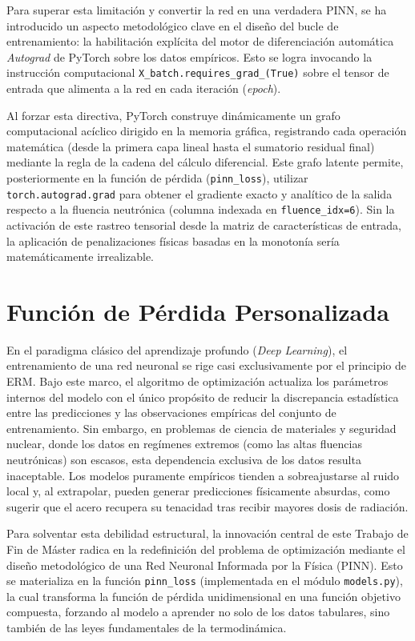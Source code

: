 \documentclass[a4paper, 12pt, twocolumn]{book}
\begin{document}
Para superar esta limitación y convertir la red en una verdadera PINN, se ha introducido un aspecto metodológico clave en el diseño del bucle de entrenamiento: la habilitación explícita del motor de diferenciación automática \textit{Autograd} de PyTorch sobre los datos empíricos. Esto se logra invocando la instrucción computacional \texttt{X\_batch.requires\_grad\_(True)} sobre el tensor de entrada que alimenta a la red en cada iteración (\textit{epoch}).

Al forzar esta directiva, PyTorch construye dinámicamente un grafo computacional acíclico dirigido en la memoria gráfica, registrando cada operación matemática (desde la primera capa lineal hasta el sumatorio residual final) mediante la regla de la cadena del cálculo diferencial. Este grafo latente permite, posteriormente en la función de pérdida (\texttt{pinn\_loss}), utilizar \texttt{torch.autograd.grad} para obtener el gradiente exacto y analítico de la salida respecto a la fluencia neutrónica (columna indexada en \texttt{fluence\_idx=6}). Sin la activación de este rastreo tensorial desde la matriz de características de entrada, la aplicación de penalizaciones físicas basadas en la monotonía sería matemáticamente irrealizable.

\section{Función de Pérdida Personalizada}

En el paradigma clásico del aprendizaje profundo (\textit{Deep Learning}), el entrenamiento de una red neuronal se rige casi exclusivamente por el principio de ERM. Bajo este marco, el algoritmo de optimización actualiza los parámetros internos del modelo con el único propósito de reducir la discrepancia estadística entre las predicciones y las observaciones empíricas del conjunto de entrenamiento. Sin embargo, en problemas de ciencia de materiales y seguridad nuclear, donde los datos en regímenes extremos (como las altas fluencias neutrónicas) son escasos, esta dependencia exclusiva de los datos resulta inaceptable. Los modelos puramente empíricos tienden a sobreajustarse al ruido local y, al extrapolar, pueden generar predicciones físicamente absurdas, como sugerir que el acero recupera su tenacidad tras recibir mayores dosis de radiación.

Para solventar esta debilidad estructural, la innovación central de este Trabajo de Fin de Máster radica en la redefinición del problema de optimización mediante el diseño metodológico de una Red Neuronal Informada por la Física (PINN). Esto se materializa en la función \texttt{pinn\_loss} (implementada en el módulo \texttt{models.py}), la cual transforma la función de pérdida unidimensional en una función objetivo compuesta, forzando al modelo a aprender no solo de los datos tabulares, sino también de las leyes fundamentales de la termodinámica.
\end{document}
